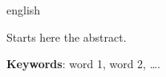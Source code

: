 \begin{resumo}[Abstract]
 \begin{otherlanguage*}{english}
  
  Starts here the abstract.

   \vspace{\onelineskip}
 
   \noindent 
   \textbf{Keywords}:  word 1, word 2, \ldots.
 \end{otherlanguage*}
\end{resumo}